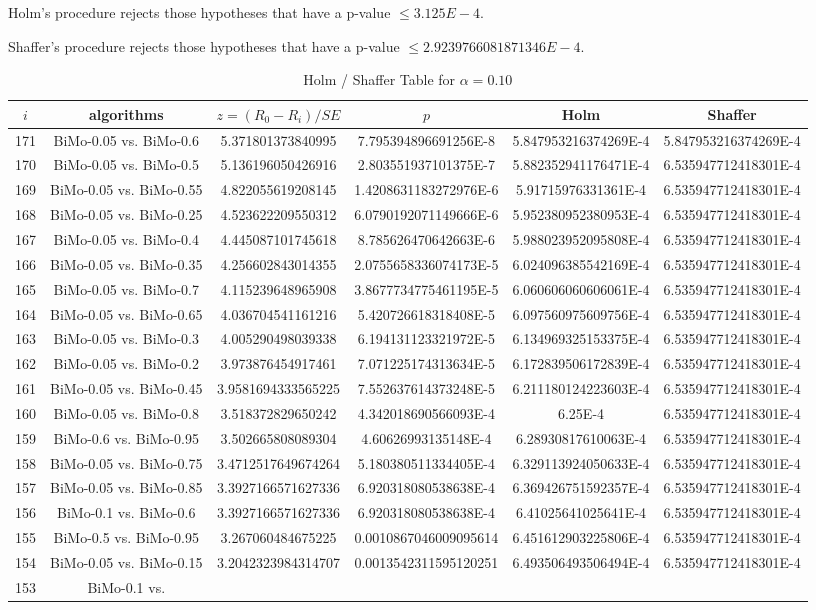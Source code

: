 \documentclass[a4paper,10pt]{article}
\begin{document}
\begin{landscape}
Holm's procedure rejects those hypotheses that have a p-value $\le3.125E-4$.


Shaffer's procedure rejects those hypotheses that have a p-value $\le2.9239766081871346E-4$.


\begin{table}[!htp]
\centering\tiny
\caption{Holm / Shaffer Table for $\alpha=0.10$}
\begin{tabular}{cccccc}
$i$&algorithms&$z=(R_0 - R_i)/SE$&$p$&Holm&Shaffer\\
\hline
171&BiMo-0.05 vs. BiMo-0.6&5.371801373840995&7.795394896691256E-8&5.847953216374269E-4&5.847953216374269E-4\\170&BiMo-0.05 vs. BiMo-0.5&5.136196050426916&2.803551937101375E-7&5.882352941176471E-4&6.535947712418301E-4\\169&BiMo-0.05 vs. BiMo-0.55&4.822055619208145&1.4208631183272976E-6&5.91715976331361E-4&6.535947712418301E-4\\168&BiMo-0.05 vs. BiMo-0.25&4.523622209550312&6.0790192071149666E-6&5.952380952380953E-4&6.535947712418301E-4\\167&BiMo-0.05 vs. BiMo-0.4&4.445087101745618&8.785626470642663E-6&5.988023952095808E-4&6.535947712418301E-4\\166&BiMo-0.05 vs. BiMo-0.35&4.256602843014355&2.0755658336074173E-5&6.024096385542169E-4&6.535947712418301E-4\\165&BiMo-0.05 vs. BiMo-0.7&4.115239648965908&3.8677734775461195E-5&6.060606060606061E-4&6.535947712418301E-4\\164&BiMo-0.05 vs. BiMo-0.65&4.036704541161216&5.420726618318408E-5&6.097560975609756E-4&6.535947712418301E-4\\163&BiMo-0.05 vs. BiMo-0.3&4.005290498039338&6.194131123321972E-5&6.134969325153375E-4&6.535947712418301E-4\\162&BiMo-0.05 vs. BiMo-0.2&3.973876454917461&7.071225174313634E-5&6.172839506172839E-4&6.535947712418301E-4\\161&BiMo-0.05 vs. BiMo-0.45&3.9581694333565225&7.552637614373248E-5&6.211180124223603E-4&6.535947712418301E-4\\160&BiMo-0.05 vs. BiMo-0.8&3.518372829650242&4.342018690566093E-4&6.25E-4&6.535947712418301E-4\\159&BiMo-0.6 vs. BiMo-0.95&3.502665808089304&4.60626993135148E-4&6.28930817610063E-4&6.535947712418301E-4\\158&BiMo-0.05 vs. BiMo-0.75&3.4712517649674264&5.180380511334405E-4&6.329113924050633E-4&6.535947712418301E-4\\157&BiMo-0.05 vs. BiMo-0.85&3.3927166571627336&6.920318080538638E-4&6.369426751592357E-4&6.535947712418301E-4\\156&BiMo-0.1 vs. BiMo-0.6&3.3927166571627336&6.920318080538638E-4&6.41025641025641E-4&6.535947712418301E-4\\155&BiMo-0.5 vs. BiMo-0.95&3.267060484675225&0.0010867046009095614&6.451612903225806E-4&6.535947712418301E-4\\154&BiMo-0.05 vs. BiMo-0.15&3.2042323984314707&0.0013542311595120251&6.493506493506494E-4&6.535947712418301E-4\\153&BiMo-0.1 vs. 
\end{tabular}
\end{table}
\end{landscape}
\end{document}
